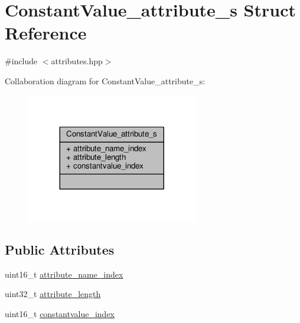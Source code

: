 \hypertarget{structConstantValue__attribute__s}{\section{Constant\+Value\+\_\+attribute\+\_\+s Struct Reference}
\label{structConstantValue__attribute__s}
}


{\ttfamily \#include $<$attributes.\+hpp$>$}



Collaboration diagram for Constant\+Value\+\_\+attribute\+\_\+s\+:\nopagebreak
\begin{figure}[H]
\begin{center}
\leavevmode
\includegraphics[width=212pt]{structConstantValue__attribute__s__coll__graph}
\end{center}
\end{figure}
\subsection*{Public Attributes}
\begin{DoxyCompactItemize}
\item 
uint16\+\_\+t \hyperlink{structConstantValue__attribute__s_a8811aed2a17e628c96b323d7e7c22edd}{attribute\+\_\+name\+\_\+index}
\item 
uint32\+\_\+t \hyperlink{structConstantValue__attribute__s_a0de6a32434624a71a93ca95870a2e727}{attribute\+\_\+length}
\item 
uint16\+\_\+t \hyperlink{structConstantValue__attribute__s_a50669a8c13452c0bc3283d182223a131}{constantvalue\+\_\+index}
\end{DoxyCompactItemize}


